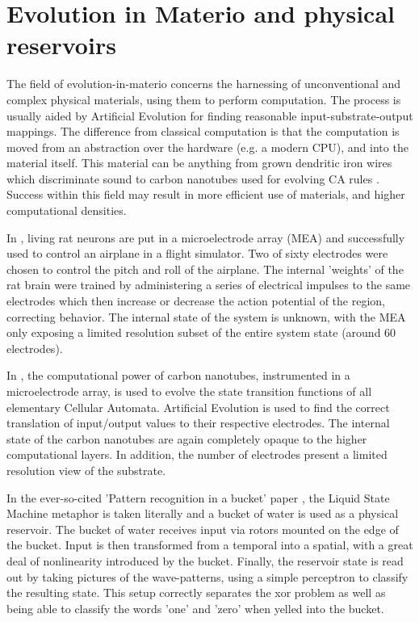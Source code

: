 \section{Evolution in Materio and physical reservoirs}
\label{section:evo-materio-physical-reservoirs}

The field of evolution-in-materio \cite{miller2002evolution} concerns the harnessing of unconventional and complex physical materials,
using them to perform computation.
The process is usually aided by Artificial Evolution for finding reasonable input-substrate-output mappings.
The difference from classical computation is that the computation is moved from an abstraction over the hardware (e.g. a modern CPU), and into the material itself.
This material can be anything from grown dendritic iron wires which discriminate sound \cite{pask1958physical} to carbon nanotubes used for evolving CA rules \cite{farstad2015evolving}.
Success within this field may result in more efficient use of materials,
and higher computational densities.

In \cite{demarse2005adaptive},
living rat neurons are put in a microelectrode array (MEA) and successfully used to control an airplane in a flight simulator.
Two of sixty electrodes were chosen to control the pitch and roll of the airplane.
The internal 'weights' of the rat brain were trained by administering a series of electrical impulses to the same electrodes which then increase or decrease the action potential of the region,
correcting behavior.
The internal state of the system is unknown,
with the MEA only exposing a limited resolution subset of the entire system state
(around 60 electrodes).

In \cite{farstad2015evolving}, the computational power of carbon nanotubes,
instrumented in a microelectrode array,
is used to evolve the state transition functions of all elementary Cellular Automata.
Artificial Evolution is used to find the correct translation of input/output values to their respective electrodes.
The internal state of the carbon nanotubes are again completely opaque to the higher computational layers.
In addition, the number of electrodes present a limited resolution view of the substrate.

In the ever-so-cited 'Pattern recognition in a bucket' paper \cite{fernando2003pattern},
the Liquid State Machine metaphor is taken literally and a bucket of water is used as a physical reservoir.
The bucket of water receives input via rotors mounted on the edge of the bucket.
Input is then transformed from a temporal into a spatial, with a great deal of nonlinearity introduced by the bucket.
Finally, the reservoir state is read out by taking pictures of the wave-patterns,
using a simple perceptron to classify the resulting state.
This setup correctly separates the xor problem as well as being able to classify the words 'one' and 'zero' when yelled into the bucket.

